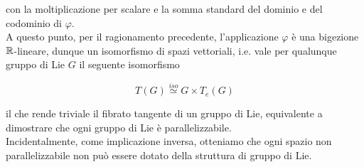 {con la moltiplicazione per scalare e la somma standard del dominio e del codominio di $ \varphi $. \\
A questo punto, per il ragionamento precedente, l'applicazione $ \varphi $ è una bigezione $ \mathbb{R} $-lineare, dunque un isomorfismo di spazi vettoriali, i.e. vale per qualunque gruppo di Lie $ G $ il seguente isomorfismo

\begin{equation}
	T(G) \stackrel{iso}{\simeq} G \times T_{e}(G)
\end{equation}

il che rende triviale il fibrato tangente di un gruppo di Lie, equivalente a dimostrare che ogni gruppo di Lie è parallelizzabile. \\
Incidentalmente, come implicazione inversa, otteniamo che ogni spazio non parallelizzabile non può essere dotato della struttura di gruppo di Lie.
}
